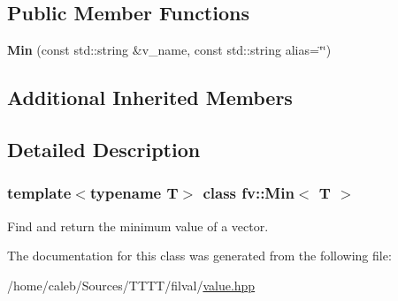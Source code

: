 \subsection*{Public Member Functions}
\begin{DoxyCompactItemize}
\item 
\hypertarget{classfv_1_1Min_a8d20082812eb64e5b40404f799b09ef8}{}\label{classfv_1_1Min_a8d20082812eb64e5b40404f799b09ef8} 
{\bfseries Min} (const std\+::string \&v\+\_\+name, const std\+::string alias=\char`\"{}\char`\"{})
\end{DoxyCompactItemize}
\subsection*{Additional Inherited Members}


\subsection{Detailed Description}
\subsubsection*{template$<$typename T$>$\newline
class fv\+::\+Min$<$ T $>$}

Find and return the minimum value of a vector. 

The documentation for this class was generated from the following file\+:\begin{DoxyCompactItemize}
\item 
/home/caleb/\+Sources/\+T\+T\+T\+T/filval/\hyperlink{value_8hpp}{value.\+hpp}\end{DoxyCompactItemize}
